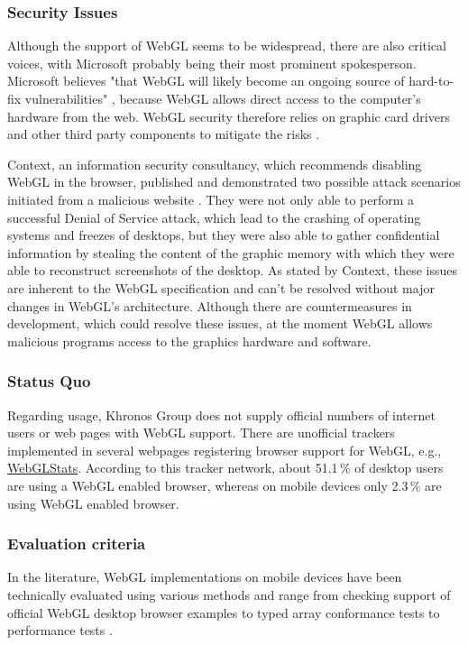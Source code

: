 \documentclass[12pt,journal,compsoc]{IEEEtran}
\begin{document}
\subsubsection{Security Issues}
Although the support of WebGL seems to be widespread, there are also critical voices, with Microsoft probably being their most prominent spokesperson. Microsoft believes "that WebGL will likely become an ongoing source of hard-to-fix vulnerabilities" \cite{microsoftWebGLHarmful}, because WebGL allows direct access to the computer’s hardware from the web. WebGL security therefore relies on graphic card drivers and other third party components to mitigate the risks \cite{microsoftWebGLHarmful}.

Context, an information security consultancy, which recommends disabling WebGL in the browser, published and demonstrated two possible attack scenarios initiated from a malicious website \cite{contextWebGL1, contextWebGL2}. They were not only able to perform a successful Denial of Service attack, which lead to the crashing of operating systems and freezes of desktops, but they were also able to gather confidential information by stealing the content of the graphic memory with which they were able to reconstruct screenshots of the desktop. As stated by Context, these issues are inherent to the WebGL specification and can't be resolved without major changes in WebGL's architecture. Although there are countermeasures in development, which could resolve these issues, at the moment WebGL allows malicious programs access to the graphics hardware and software. \cite{contextWebGL1, contextWebGL2}


\subsubsection{Status Quo}
Regarding usage, Khronos Group does not supply official numbers of internet users or web pages with WebGL support. There are unofficial trackers implemented in several webpages registering browser support for WebGL, e.g., \url{WebGLStats}. According to this tracker network, about 51.1\,\% of desktop users are using a WebGL enabled browser, whereas on mobile devices only 2.3\,\% are using WebGL enabled browser.


\subsubsection{Evaluation criteria}
In the literature, WebGL implementations on mobile devices have been technically evaluated using various methods and range from checking support of official WebGL desktop browser examples to typed array conformance tests to performance tests \cite{Golubovic2011}. 
\end{document}
